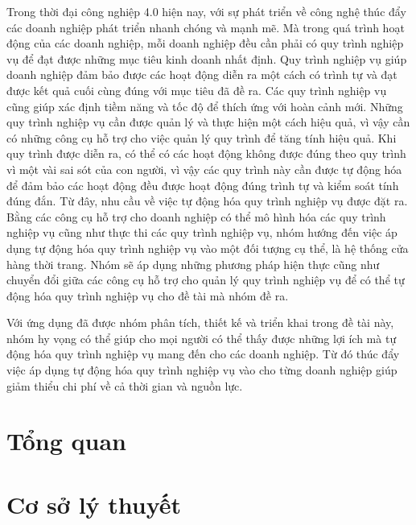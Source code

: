 \documentclass[a4paper, oneside, 12pt]{report}
\theoremstyle{definition}
\begin{document}
	Trong thời đại công nghiệp 4.0 hiện nay, với sự phát triển về công nghệ thúc đẩy các doanh nghiệp phát triển nhanh chóng và mạnh mẽ. Mà trong quá trình hoạt động của các doanh nghiệp, mỗi doanh nghiệp đều cần phải có quy trình nghiệp vụ để đạt được những mục tiêu kinh doanh nhất định. Quy trình nghiệp vụ giúp doanh nghiệp đảm bảo được các hoạt động diễn ra một cách có trình tự và đạt được kết quả cuối cùng đúng với mục tiêu đã đề ra. Các quy trình nghiệp vụ cũng giúp xác định tiềm năng và tốc độ để thích ứng với hoàn cảnh mới. Những quy trình nghiệp vụ cần được quản lý và thực hiện một cách hiệu quả, vì vậy cần có những công cụ hỗ trợ cho việc quản lý quy trình để tăng tính hiệu quả. Khi quy trình được diễn ra, có thể có các hoạt động không được đúng theo quy trình vì một vài sai sót của con người, vì vậy các quy trình này cần được tự động hóa để đảm bảo các hoạt động đều được hoạt động đúng trình tự và kiểm soát tính đúng đắn. Từ đây, nhu cầu về việc tự động hóa quy trình nghiệp vụ được đặt ra. Bằng các công cụ hỗ trợ cho doanh nghiệp có thể mô hình hóa các quy trình nghiệp vụ cũng như thực thi các quy trình nghiệp vụ, nhóm hướng đến việc áp dụng tự động hóa quy trình nghiệp vụ vào một đối tượng cụ thể, là hệ thống cửa hàng thời trang. Nhóm sẽ áp dụng những phương pháp hiện thực cũng như chuyển đổi giữa các công cụ hỗ trợ cho quản lý quy trình nghiệp vụ để có thể tự động hóa quy trình nghiệp vụ cho đề tài mà nhóm đề ra.

	Với ứng dụng đã được nhóm phân tích, thiết kế và triển khai trong đề tài này, nhóm hy vọng có thể giúp cho mọi người có thể thấy được những lợi ích mà tự động hóa quy trình nghiệp vụ mang đến cho các doanh nghiệp. Từ đó thúc đẩy việc áp dụng tự động hóa quy trình nghiệp vụ vào cho từng doanh nghiệp giúp giảm thiểu chi phí về cả thời gian và nguồn lực.

\setlength{\parskip}{0mm}

\clearpage
\thispagestyle{empty}
\hfill
\clearpage

\tableofcontents


\chapter{Tổng quan}



\chapter{Cơ sở lý thuyết}

\end{document}
